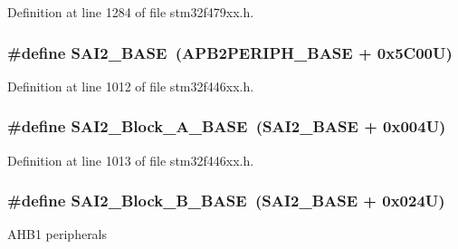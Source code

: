 Definition at line 1284 of file stm32f479xx.\+h.

\subsubsection[{\texorpdfstring{S\+A\+I2\+\_\+\+B\+A\+SE}{SAI2_BASE}}]{\setlength{\rightskip}{0pt plus 5cm}\#define S\+A\+I2\+\_\+\+B\+A\+SE~({\bf A\+P\+B2\+P\+E\+R\+I\+P\+H\+\_\+\+B\+A\+SE} + 0x5\+C00\+U)}\hypertarget{group___peripheral__memory__map_ga4b4d5c95ea5f835f9ac37fab90a2d700}{}\label{group___peripheral__memory__map_ga4b4d5c95ea5f835f9ac37fab90a2d700}


Definition at line 1012 of file stm32f446xx.\+h.

\subsubsection[{\texorpdfstring{S\+A\+I2\+\_\+\+Block\+\_\+\+A\+\_\+\+B\+A\+SE}{SAI2_Block_A_BASE}}]{\setlength{\rightskip}{0pt plus 5cm}\#define S\+A\+I2\+\_\+\+Block\+\_\+\+A\+\_\+\+B\+A\+SE~({\bf S\+A\+I2\+\_\+\+B\+A\+SE} + 0x004\+U)}\hypertarget{group___peripheral__memory__map_gad2992b5770984ddee4c1b7e325d238f3}{}\label{group___peripheral__memory__map_gad2992b5770984ddee4c1b7e325d238f3}


Definition at line 1013 of file stm32f446xx.\+h.

\subsubsection[{\texorpdfstring{S\+A\+I2\+\_\+\+Block\+\_\+\+B\+\_\+\+B\+A\+SE}{SAI2_Block_B_BASE}}]{\setlength{\rightskip}{0pt plus 5cm}\#define S\+A\+I2\+\_\+\+Block\+\_\+\+B\+\_\+\+B\+A\+SE~({\bf S\+A\+I2\+\_\+\+B\+A\+SE} + 0x024\+U)}\hypertarget{group___peripheral__memory__map_ga034a6ac8f61e4d15cd9f2f7eca140569}{}\label{group___peripheral__memory__map_ga034a6ac8f61e4d15cd9f2f7eca140569}
A\+H\+B1 peripherals 

